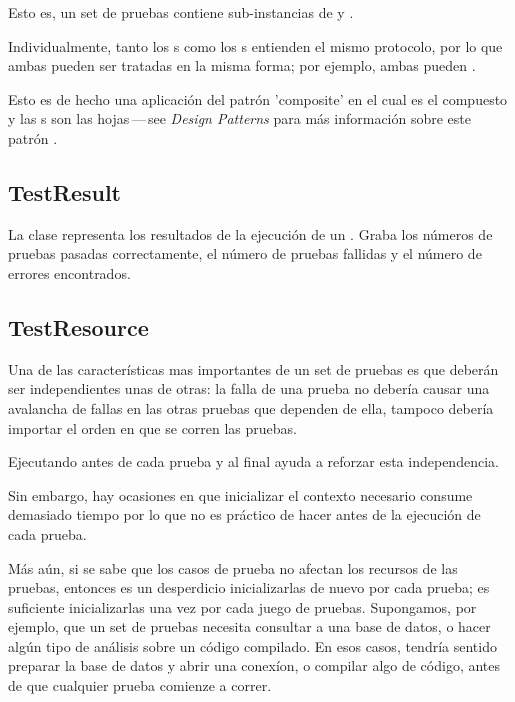 \documentclass[a4paper,10pt,twoside]{book}
\begin{document}
Esto es, un set de pruebas contiene sub-instancias de  y .

Individualmente, tanto los s como los s entienden el mismo protocolo,
por lo que ambas pueden ser tratadas en la misma forma; por ejemplo, ambas pueden .

Esto es de hecho una aplicaci\'on del patr\'on 'composite' en el cual  es el compuesto
y las s son las hojas\,---\,see \textit{Design Patterns} para m\'as informaci\'on sobre este patr\'on \cite{Gamm95a}.

\subsection{TestResult}

La clase  representa los resultados de la ejecuci\'on de un .
Graba los n\'umeros de pruebas pasadas correctamente, el n\'umero de pruebas fallidas y el n\'umero
de errores encontrados.

\subsection{TestResource}

Una de las caracter\'isticas mas importantes de un set de pruebas es que 
deber\'an ser independientes unas de otras: la falla de una prueba no deber\'ia causar una avalancha
de fallas en las otras pruebas que dependen de ella, tampoco deber\'ia importar el orden en que se corren las
pruebas.  

Ejecutando  antes de cada prueba y  al final ayuda a reforzar esta independencia.
 
Sin embargo, hay ocasiones en que inicializar el contexto necesario consume demasiado tiempo por lo que no es 
pr\'actico de hacer antes de la ejecuci\'on de cada prueba.

M\'as a\'un, si se sabe que los casos de prueba no afectan los recursos de las pruebas, entonces es un
desperdicio inicializarlas de nuevo por cada prueba; es suficiente inicializarlas una vez por cada juego
de pruebas.
Supongamos, por ejemplo, que un set de pruebas necesita consultar a una base de datos, o hacer
alg\'un tipo de an\'alisis sobre un c\'odigo compilado.
En esos casos, tendr\'ia sentido preparar la base de datos y abrir una conex\'ion, o compilar algo
de c\'odigo, antes de que cualquier prueba comienze a correr.
\end{document}
